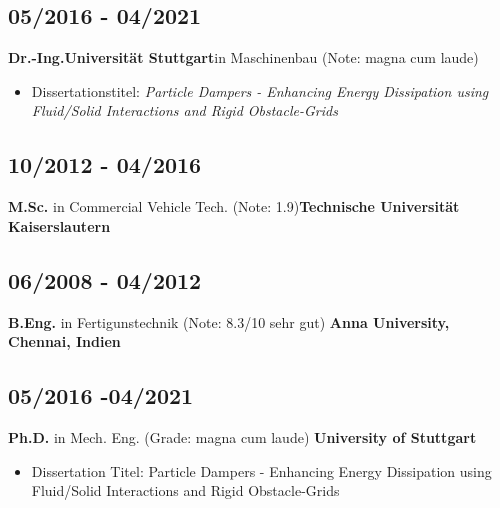 \documentclass{classic}
\begin{document}
{\rlap{\color{templateColor4}\rule[0mm]{\textwidth}{\ulinewidth}}}
\begin{paracol}{2}
    \switchcolumn
    {
            \subsection{05/2016 - 04/2021}{\bfseries Dr.-Ing.}{\bfseries Universit{\"a}t
            Stuttgart}{in Maschinenbau (Note: magna cum laude)}
              \begin{itemize}
                  \item Dissertationstitel: \textit{Particle Dampers - Enhancing
                      Energy Dissipation using Fluid/Solid Interactions and Rigid
                  Obstacle-Grids}
              \end{itemize}
            
              \subsection{10/2012 - 04/2016}{{\bfseries M.Sc.} in Commercial
            Vehicle Tech. (Note: 1.9)}{\bfseries Technische Universit{\"a}t Kaiserslautern
            }\\
            
            \subsection{06/2008 - 04/2012}{{\bfseries B.Eng.} in
            Fertigunstechnik (Note:
            8.3/10 {sehr gut})} {\bfseries Anna University, Chennai, Indien }\\
    
    }
    {
            \subsection{05/2016 -04/2021}
            {{\bfseries Ph.D.} in Mech. Eng. (Grade: magna cum laude)}
            {\bfseries University of Stuttgart}
              \begin{itemize}
                  \item Dissertation Titel: Particle Dampers - Enhancing
                      Energy Dissipation using Fluid/Solid Interactions and Rigid
                      Obstacle-Grids
              \end{itemize}
    
}
\end{paracol}
\end{document}
